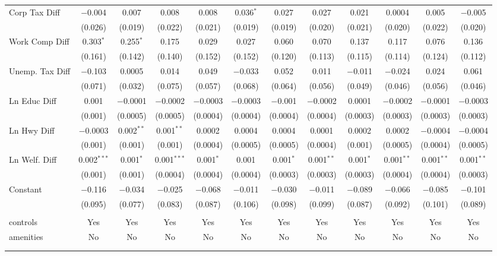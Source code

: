\begin{table}[!htbp]
\begin{tabular}{@{\extracolsep{5pt}}lccccccccccc}
  Corp Tax Diff & $-$0.004 & 0.007 & 0.008 & 0.008 & 0.036$^{*}$ & 0.027 & 0.027 & 0.021 & 0.0004 & 0.005 & $-$0.005 \\ 
  & (0.026) & (0.019) & (0.022) & (0.021) & (0.019) & (0.019) & (0.020) & (0.021) & (0.020) & (0.022) & (0.020) \\ 
  Work Comp Diff & 0.303$^{*}$ & 0.255$^{*}$ & 0.175 & 0.029 & 0.027 & 0.060 & 0.070 & 0.137 & 0.117 & 0.076 & 0.136 \\ 
  & (0.161) & (0.142) & (0.140) & (0.152) & (0.152) & (0.120) & (0.113) & (0.115) & (0.114) & (0.124) & (0.112) \\ 
  Unemp. Tax Diff & $-$0.103 & 0.0005 & 0.014 & 0.049 & $-$0.033 & 0.052 & 0.011 & $-$0.011 & $-$0.024 & 0.024 & 0.061 \\ 
  & (0.071) & (0.032) & (0.075) & (0.057) & (0.068) & (0.064) & (0.056) & (0.049) & (0.046) & (0.056) & (0.046) \\ 
  Ln Educ Diff & 0.001 & $-$0.0001 & $-$0.0002 & $-$0.0003 & $-$0.0003 & $-$0.001 & $-$0.0002 & 0.0001 & $-$0.0002 & $-$0.0001 & $-$0.0003 \\ 
  & (0.001) & (0.0005) & (0.0005) & (0.0004) & (0.0004) & (0.0004) & (0.0004) & (0.0003) & (0.0003) & (0.0003) & (0.0003) \\ 
  Ln Hwy Diff & $-$0.0003 & 0.002$^{**}$ & 0.001$^{**}$ & 0.0002 & 0.0004 & 0.0004 & 0.0001 & 0.0002 & 0.0002 & $-$0.0004 & $-$0.0004 \\ 
  & (0.001) & (0.001) & (0.001) & (0.0004) & (0.0005) & (0.0005) & (0.0004) & (0.001) & (0.0005) & (0.0004) & (0.0005) \\ 
  Ln Welf. Diff & 0.002$^{***}$ & 0.001$^{*}$ & 0.001$^{***}$ & 0.001$^{*}$ & 0.001 & 0.001$^{*}$ & 0.001$^{**}$ & 0.001$^{*}$ & 0.001$^{**}$ & 0.001$^{**}$ & 0.001$^{**}$ \\ 
  & (0.001) & (0.001) & (0.0004) & (0.0004) & (0.0004) & (0.0003) & (0.0003) & (0.0003) & (0.0004) & (0.0004) & (0.0003) \\ 
  Constant & $-$0.116 & $-$0.034 & $-$0.025 & $-$0.068 & $-$0.011 & $-$0.030 & $-$0.011 & $-$0.089 & $-$0.066 & $-$0.085 & $-$0.101 \\ 
  & (0.095) & (0.077) & (0.083) & (0.087) & (0.106) & (0.098) & (0.099) & (0.087) & (0.092) & (0.101) & (0.089) \\ 
 \hline \\[-1.8ex] 
controls & Yes & Yes & Yes & Yes & Yes & Yes & Yes & Yes & Yes & Yes & Yes \\ 
amenities & No & No & No & No & No & No & No & No & No & No & No \\ 
\hline \\[-1.8ex] 
\hline 
\hline \\[-1.8ex] 
\end{tabular} 
\end{table} 
